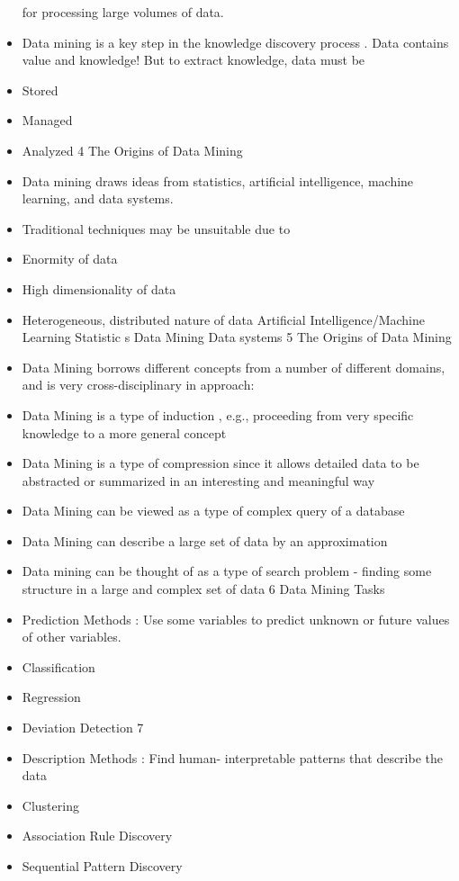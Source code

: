 \documentclass{amsbook}
\theoremstyle{plain}
\numberwithin{section}{chapter}
\numberwithin{equation}{chapter}
\theoremstyle{definition}
\theoremstyle{remark}
\begin{document}
\begin{itemize}
 for processing large volumes of 
data.
\item
Data mining is a key step in the 
knowledge discovery process
. 
Data contains value and knowledge!
But to extract knowledge, data must be 
\item
Stored
\item
Managed
\item
Analyzed
4
The Origins of Data Mining
\item
Data mining draws ideas from statistics, artificial intelligence, 
machine learning, and data systems. 
\item
Traditional techniques 
may be unsuitable due to 
\item
Enormity of data
\item
High dimensionality of data
\item
Heterogeneous, distributed nature 
of data
Artificial 
Intelligence/Machine 
Learning
Statistic
s
Data 
Mining
Data 
systems
5
The Origins of Data Mining
\item
Data Mining borrows different concepts from a number of 
different domains, and is very cross-disciplinary in approach:
\item
Data Mining is a type of 
induction
, e.g., proceeding from very 
specific knowledge to a more general concept
\item
Data Mining is a type of 
compression 
since it allows detailed data to 
be abstracted or summarized in an interesting and meaningful way
\item
Data Mining can be viewed as a type of complex 
query
 of  a 
database
\item
Data Mining can describe a large set of data by an 
approximation
\item
Data mining can be thought of as a type of 
search problem - 
finding 
some structure in a large and complex set of data
6
Data Mining Tasks
\item
Prediction Methods
: 
Use some variables to 
predict unknown or future values of other 
variables.
\item
Classification 
\item
Regression
\item
Deviation Detection
7
\item
Description Methods
: Find human-
interpretable patterns that describe the data
\item
Clustering
\item
Association Rule Discovery 
\item
Sequential Pattern Discovery

\end{itemize}
\tiny
\end{document}
